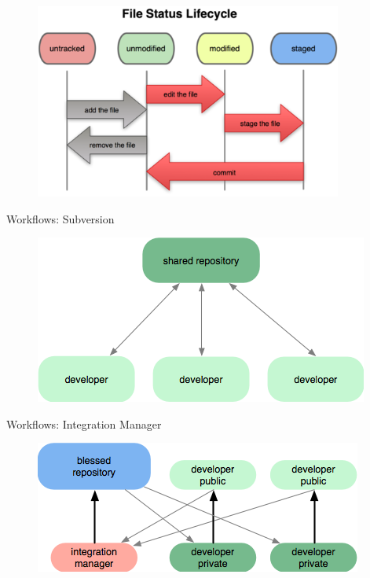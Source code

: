 \documentclass{beamer}
\begin{document}
\begin{frame}

 \begin{figure}
  \includegraphics[width=0.90\textwidth]{./images/file-status-lifecycle.png}
 \end{figure}

\end{frame}

\begin{frame}{Workflows: Subversion}

  \begin{figure}
     \includegraphics[scale=1.0]{./images/workflow-svn.png}
  \end{figure}

\end{frame}

\begin{frame}{Workflows: Integration Manager}
 
  \begin{figure}
     \includegraphics[scale=1.0]{./images/workflow-integration-manager.png}
  \end{figure}

\end{frame}
\end{document}
